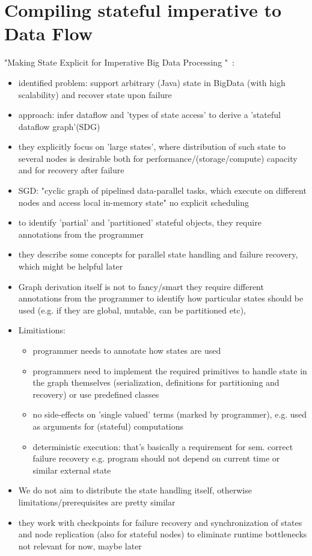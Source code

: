 \section{Compiling stateful imperative to Data Flow}
"Making State Explicit for Imperative Big Data Processing
"~\cite{fernandez2014making}:
\begin{itemize}
    \item identified problem: support arbitrary (Java) state in BigData (with high scalability) and recover state upon failure
    \item approach: infer dataflow and 'types of state access' to derive a 'stateful dataflow graph'(SDG)
    \item they explicitly focus on 'large states', where distribution of such state to several nodes is desirable both for performance/(storage/compute) capacity and for recovery after failure 
    \item SGD: "cyclic graph of pipelined data-parallel tasks, which execute on different nodes and access local in-memory state" \means no explicit scheduling
\item to identify 'partial' and 'partitioned' stateful objects, they require annotations from the programmer
\item they describe some concepts for parallel state handling and failure recovery, which might be helpful later
\item Graph derivation itself is not to fancy/smart \means  they require different annotations from the programmer to identify how particular states should be used (e.g. if they are global, mutable, can be partitioned etc), 
\item Limitiations:
\begin{itemize}
    \item programmer needs to annotate how states are used
    \item programmers need to implement the required primitives to handle state in the graph themselves (serialization, definitions for partitioning and recovery) or use predefined classes
    \item no side-effects on 'single valued' terms (marked by programmer), e.g. used as arguments for (stateful) computations
    \item deterministic execution: that's basically a requirement for sem. correct failure recovery e.g. program should not depend on current time or similar external state 
\end{itemize}
\item We do not aim to distribute the state handling itself, otherwise limitations/prerequisites are pretty similar
\item they work with checkpoints for failure recovery and synchronization of states and node replication (also for stateful nodes) to eliminate runtime bottlenecks \means not relevant for now, maybe later
\end{itemize}

